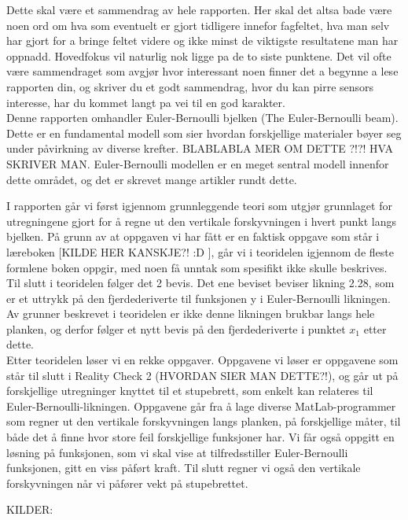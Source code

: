 Dette skal være et sammendrag av hele rapporten. Her skal det altsa bade være noen ord om hva som eventuelt er gjort tidligere innefor fagfeltet, hva man selv har gjort for a bringe feltet videre og ikke minst de viktigste resultatene man har oppnadd. Hovedfokus vil naturlig nok ligge pa de to siste punktene. Det vil ofte være sammendraget som avgjør hvor interessant noen finner det a begynne a lese rapporten din, og skriver du et godt sammendrag, hvor du kan pirre sensors interesse, har du kommet langt pa vei til en god karakter.\\

Denne rapporten omhandler Euler-Bernoulli bjelken (The Euler-Bernoulli beam). Dette er en fundamental modell som sier hvordan forskjellige materialer bøyer seg under påvirkning av diverse krefter. BLABLABLA MER OM DETTE ?!?! HVA SKRIVER MAN. 
Euler-Bernoulli modellen er en meget sentral modell innenfor dette området, og det er skrevet mange artikler rundt dette.

I rapporten går vi først igjennom grunnleggende teori som utgjør grunnlaget for utregningene gjort for å regne ut den vertikale forskyvningen i hvert punkt langs bjelken. På grunn av at oppgaven vi har fått er en faktisk oppgave som står i læreboken [KILDE HER KANSKJE?! :D ], går vi i teoridelen igjennom de fleste formlene boken oppgir, med noen få unntak som spesifikt ikke skulle beskrives. Til slutt i teoridelen følger det 2 bevis. Det ene beviset beviser likning 2.28, som er et uttrykk på den fjerdederiverte til funksjonen y i Euler-Bernoulli likningen. Av grunner beskrevet i teoridelen er ikke denne likningen brukbar langs hele planken, og derfor følger et nytt bevis på den fjerdederiverte i punktet $x_1$ etter dette. \\

Etter teoridelen løser vi en rekke oppgaver. Oppgavene vi løser er oppgavene som står til slutt i Reality Check 2 (HVORDAN SIER MAN DETTE?!), og går ut på forskjellige utregninger knyttet til et stupebrett, som enkelt kan relateres til Euler-Bernoulli-likningen. Oppgavene går fra å lage diverse MatLab-programmer som regner ut den vertikale forskyvningen langs planken, på forskjellige måter, til både det å finne hvor store feil forskjellige funksjoner har. Vi får også oppgitt en løsning på funksjonen, som vi skal vise at tilfredsstiller Euler-Bernoulli funksjonen, gitt en viss påført kraft. Til slutt regner vi også den vertikale forskyvningen når vi påfører vekt på stupebrettet. 

KILDER: 

